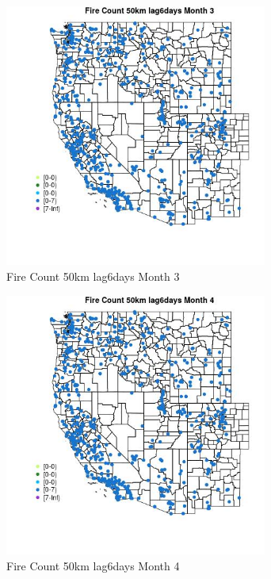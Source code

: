 \begin{figure} 
\centering  
\includegraphics[width=0.77\textwidth]{Code_Outputs/Report_ML_input_PM25_Step4_part_e_de_duplicated_aves_compiled_2019-05-21wNAs_MapObsMo3Fire_Count_50km_lag6days.jpg} 
\caption{\label{fig:Report_ML_input_PM25_Step4_part_e_de_duplicated_aves_compiled_2019-05-21wNAsMapObsMo3Fire_Count_50km_lag6days}Fire Count 50km lag6days Month 3} 
\end{figure} 
 

\begin{figure} 
\centering  
\includegraphics[width=0.77\textwidth]{Code_Outputs/Report_ML_input_PM25_Step4_part_e_de_duplicated_aves_compiled_2019-05-21wNAs_MapObsMo4Fire_Count_50km_lag6days.jpg} 
\caption{\label{fig:Report_ML_input_PM25_Step4_part_e_de_duplicated_aves_compiled_2019-05-21wNAsMapObsMo4Fire_Count_50km_lag6days}Fire Count 50km lag6days Month 4} 
\end{figure} 
 

